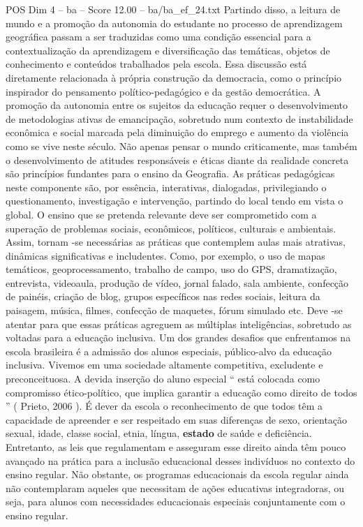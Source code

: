 \begin{textsample}{POS Dim 4 – ba – Score 12.00 – ba/ba\_ef\_24.txt}
Partindo disso, a leitura de mundo e a promoção da autonomia do estudante no processo de aprendizagem geográfica passam a ser traduzidas como uma condição essencial para a contextualização da aprendizagem e diversificação das temáticas, objetos de conhecimento e conteúdos trabalhados pela escola.
Essa discussão está diretamente relacionada à própria construção da democracia, como o princípio inspirador do pensamento político-pedagógico e da gestão democrática.
A promoção da autonomia entre os sujeitos da educação requer o desenvolvimento de metodologias ativas de emancipação, sobretudo num contexto de instabilidade econômica e social marcada pela diminuição do emprego e aumento da violência como se vive neste século.
Não apenas pensar o mundo criticamente, mas também o desenvolvimento de atitudes responsáveis e éticas diante da realidade concreta são princípios fundantes para o ensino da Geografia.
As práticas pedagógicas neste componente são, por essência, interativas, dialogadas, privilegiando o questionamento, investigação e intervenção, partindo do local tendo em vista o global.
O ensino que se pretenda relevante deve ser comprometido com a superação de problemas sociais, econômicos, políticos, culturais e ambientais.
Assim, tornam -se necessárias as práticas que contemplem aulas mais atrativas, dinâmicas significativas e includentes.
Como, por exemplo, o uso de mapas temáticos, geoprocessamento, trabalho de campo, uso do GPS, dramatização, entrevista, videoaula, produção de vídeo, jornal falado, sala ambiente, confecção de painéis, criação de blog, grupos específicos nas redes sociais, leitura da paisagem, música, filmes, confecção de maquetes, fórum simulado etc.
Deve -se atentar para que essas práticas agreguem as múltiplas inteligências, sobretudo as voltadas para a educação inclusiva.
Um dos grandes desafios que enfrentamos na escola brasileira é a admissão dos alunos especiais, público-alvo da educação inclusiva.
Vivemos em uma sociedade altamente competitiva, excludente e preconceituosa.
A devida inserção do aluno especial “ está colocada como compromisso ético-político, que implica garantir a educação como direito de todos ” ( Prieto, 2006 ).
É dever da escola o reconhecimento de que todos têm a capacidade de apreender e ser respeitado em suas diferenças de sexo, orientação sexual, idade, classe social, etnia, língua, \textbf{estado} de saúde e deficiência.
Entretanto, as leis que regulamentam e asseguram esse direito ainda têm pouco avançado na prática para a inclusão educacional desses indivíduos no contexto do ensino regular.
Não obstante, os programas educacionais da escola regular ainda não contemplaram aqueles que necessitam de ações educativas integradoras, ou seja, para alunos com necessidades educacionais especiais conjuntamente com o ensino regular.

\end{textsample}
